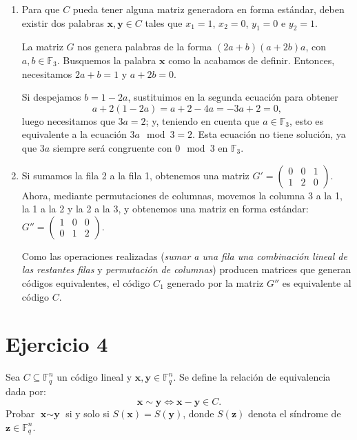 \begin{enumerate}[label=\alph*)]
	\item Para que $C$ pueda tener alguna matriz generadora en forma estándar, deben existir dos palabras $\textbf{x}, \textbf{y} \in C$ tales que $x_1 = 1$, $x_2 = 0$, $y_1 = 0$ e $y_2 = 1$.
	
	La matriz $G$ nos genera palabras de la forma $(2a + b)(a + 2b)a$, con $a,b \in \mathbb{F}_3$. Busquemos la palabra $\textbf{x}$ como la acabamos de definir. Entonces, necesitamos $2a + b = 1$ y $a + 2b = 0$.
	
	Si despejamos $b = 1 - 2a$, sustituimos en la segunda ecuación para obtener
	\[a + 2(1-2a) = a + 2 - 4a = -3a + 2 = 0,\]
	luego necesitamos que $3a = 2$; y, teniendo en cuenta que $a\in\mathbb{F}_3$, esto es equivalente a la ecuación $3a\mod3 = 2$. Esta ecuación no tiene solución, ya que $3a$ siempre será congruente con $0 \mod 3$ en $\mathbb{F}_3$.
	
	\item Si sumamos la fila 2 a la fila 1, obtenemos una matriz $G' = \begin{pmatrix}
		0 & 0 & 1 \\
		1 & 2 & 0
	\end{pmatrix}$. Ahora, mediante permutaciones de columnas, movemos la columna 3 a la 1, la 1 a la 2 y la 2 a la 3, y obtenemos una matriz en forma estándar: $G'' = \begin{pmatrix}
	1 & 0 & 0 \\
	0 & 1 & 2
	\end{pmatrix}$.
	
	Como las operaciones realizadas (\textit{sumar a una fila una combinación lineal de las restantes filas} y \textit{permutación de columnas}) producen matrices que generan códigos equivalentes, el código $C_1$ generado por la matriz $G''$ es equivalente al código $C$.
\end{enumerate}

\section{Ejercicio 4}

\begin{formulationBox}
	Sea $C \subseteq \mathbb{F}_q^n$ un código lineal y $\textbf{x}, \textbf{y}\in\mathbb{F}_q^n$. Se define la relación de equivalencia dada por:
	\[\textbf{x}\sim\textbf{y} \iff \textbf{x}-\textbf{y}\in C.\]
	Probar $\textbf{x}\sim\textbf{y}$ si y solo si $S(\textbf{x}) = S(\textbf{y})$, donde $S(\textbf{z})$ denota el síndrome de $\textbf{z}\in\mathbb{F}_q^n$.
\end{formulationBox}

